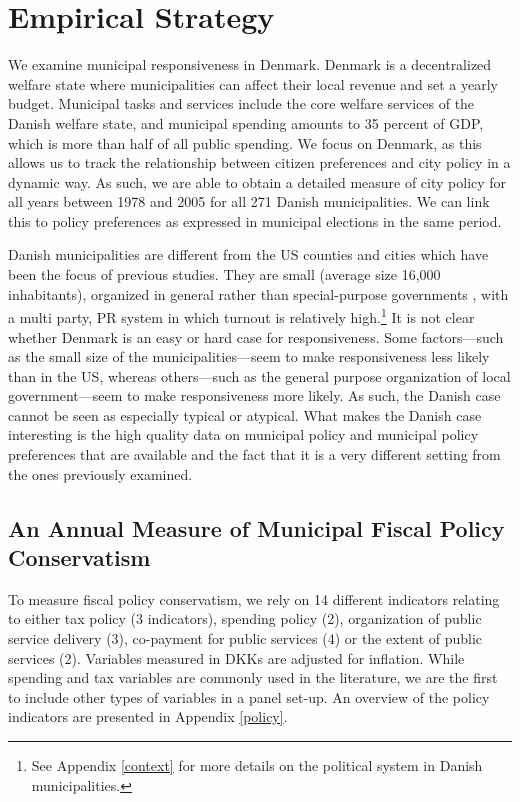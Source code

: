 \documentclass[a4paper,12pt]{article}
\begin{document}
\section*{Empirical Strategy}

 We examine municipal responsiveness in Denmark. Denmark is a decentralized welfare state where municipalities can affect their local revenue and set a yearly budget.  Municipal tasks and services include the core welfare services of the Danish welfare state, and municipal spending amounts to 35 percent of GDP, which is more than half of all public spending. We focus on Denmark, as this allows us to track the relationship between citizen preferences and city policy in a dynamic way. As such, we are able to obtain a detailed measure of city policy for all years between 1978 and 2005 for all 271 Danish municipalities.  We can link this to policy preferences as expressed in municipal elections in the same period.
 
 

Danish municipalities are different from the US counties and cities which have been the focus of previous studies. They are small (average size 16,000 inhabitants), organized in general rather than special-purpose governments \citep{berry2009imperfect}, with a multi party, PR system in which turnout is relatively high.\footnote{See Appendix \ref{context} for more details on the political system in Danish municipalities.} It is not clear whether Denmark is an easy or hard case for responsiveness.  Some factors---such as the small size of the municipalities---seem to make responsiveness less likely than in the US, whereas others---such as the general purpose organization of local government---seem to make responsiveness more likely. As such, the Danish case cannot be seen as especially typical or atypical. What makes the Danish case interesting is the high quality data on municipal policy and municipal policy preferences that are available and the fact that it is a very different setting from the ones previously examined.


\subsection*{An Annual Measure of Municipal Fiscal Policy Conservatism}

To measure fiscal policy conservatism, we rely on 14 different indicators relating to either tax policy (3 indicators), spending policy (2), organization of public service delivery (3), co-payment for public services (4) or the extent of public services (2). Variables measured in DKKs are adjusted for inflation. While  spending and tax variables are commonly used in the literature, we are the first to include other types of variables in a panel set-up. An overview of the policy indicators are presented in Appendix \ref{policy}.
\end{document}
